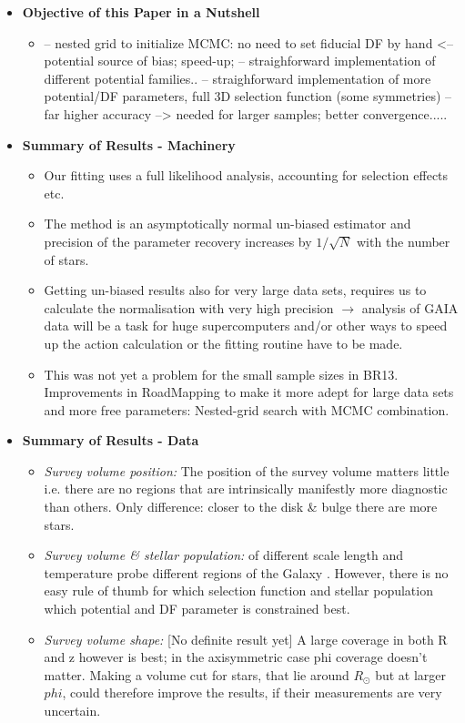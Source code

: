 \begin{itemize}

\item \textbf{Objective of this Paper in a Nutshell}
\begin{itemize}
\item 

--  nested grid to initialize MCMC: no need to set fiducial DF by hand <-- potential source of bias; speed-up; 
-- straighforward implementation of different potential families..
-- straighforward implementation of more potential/DF parameters, full 3D selection function (some symmetries) 
-- far higher accuracy --> needed for larger samples; better convergence.....


\end{itemize}

\item \textbf{Summary of Results - Machinery}

\begin{itemize}
\item Our fitting uses a full likelihood analysis, accounting for selection effects etc.
\item The method is an asymptotically normal un-biased estimator and precision of the parameter recovery increases by $1/\sqrt{N}$ with the number of stars.
\item Getting un-biased results also for very large data sets, requires us to calculate the normalisation with very high precision $\longrightarrow$ analysis of GAIA data will be a task for huge supercomputers and/or other ways to speed up the action calculation or the fitting routine have to be made.
\item This was not yet a problem for the small sample sizes in BR13. Improvements in RoadMapping to make it more adept for large data sets and more free parameters: Nested-grid search with MCMC combination.
\end{itemize}

\item \textbf{Summary of Results - Data}

\begin{itemize}
\item \emph{Survey volume position:} The position of the survey volume matters little i.e. there are no regions that are intrinsically manifestly more diagnostic than others. Only difference: closer to the disk \& bulge there are more stars.
\item \emph{Survey volume \& stellar population:} \MAPs of different scale length and temperature probe different regions of the Galaxy \citep{bov13}. However, there is no easy rule of thumb for which selection function and stellar population which potential and DF parameter is constrained best.
\item \emph{Survey volume shape:} [No definite result yet] A large coverage in both R and z however is best; in the axisymmetric case phi coverage doesn't matter. Making a volume cut for stars, that lie around $R_\odot$ but at larger $phi$, could therefore improve the results, if their measurements are very uncertain.


\end{itemize}
\end{itemize}
